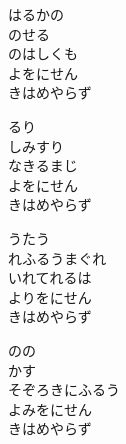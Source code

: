 \documentclass[10pt,b5j]{tarticle} %
\begin{document}
\vspace{1.5em} %
\newcommand{\linespace}{0.5em} %
\newcommand{\blocksize}{0.5\hsize} %
\begin{enumerate} %
    \begin{minipage}[c]{\blocksize}
    
        \vspace{\linespace}
        \item
        はるかの\\
        のせる\\
        のはしくも\\
        よをにせん\\
        きはめやらず
        
        \vspace{\linespace}
        \item
        るり\\
        しみすり\\
        なきるまじ\\
        よをにせん\\
        きはめやらず
        
        \vspace{\linespace}
        \item
        うたう\\
        れふるうまぐれ\\
        いれてれるは\\
        よりをにせん\\
        きはめやらず
        
        \vspace{\linespace}
        \item
        のの\\
        かす\\
        そぞろきにふるう\\
        よみをにせん\\
        きはめやらず
    
    \end{minipage}
\end{enumerate} %
\end{document}
